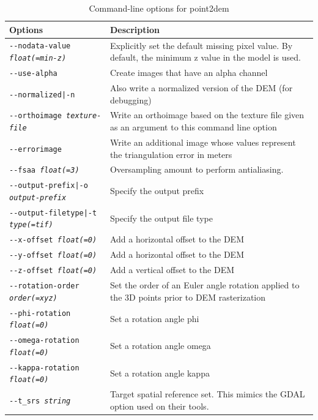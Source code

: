 \begin{longtable}{|p{8cm}|p{9cm}|}
\caption{Command-line options for point2dem}
\label{tbl:point2dem}
\endfirsthead
\endhead
\endfoot
\endlastfoot
\hline
Options & Description \\ \hline \hline
\texttt{-\/-nodata-value \textit{float(=min-z)}} & Explicitly set the default missing pixel value. By default, the minimum z value in the model is used. \\ \hline
\texttt{-\/-use-alpha} & Create images that have an alpha channel \\ \hline
\texttt{-\/-normalized|-n} & Also write a normalized version of the \ac{DEM} (for debugging) \\ \hline
\texttt{-\/-orthoimage \textit{texture-file}} & Write an orthoimage based on the texture file given as an argument to this command line option \\ \hline
\texttt{-\/-errorimage} & Write an additional image whose values represent the triangulation error in meters \\ \hline
\texttt{-\/-fsaa  \textit{float(=3)}} & Oversampling amount to perform antialiasing. \\ \hline
\texttt{-\/-output-prefix|-o \textit{output-prefix}} & Specify the output prefix \\ \hline
\texttt{-\/-output-filetype|-t \textit{type(=tif)}} & Specify the output file type \\ \hline
\hline
\texttt{-\/-x-offset \textit{float(=0)}} & Add a horizontal offset to the \ac{DEM} \\ \hline
\texttt{-\/-y-offset \textit{float(=0)}} & Add a horizontal offset to the \ac{DEM} \\ \hline
\texttt{-\/-z-offset \textit{float(=0)}} & Add a vertical offset to the \ac{DEM} \\ \hline
\texttt{-\/-rotation-order \textit{order(=xyz)}} & Set the order of an Euler angle rotation applied to the 3D points prior to \ac{DEM} rasterization \\ \hline
\texttt{-\/-phi-rotation \textit{float(=0)}} & Set a rotation angle phi \\ \hline
\texttt{-\/-omega-rotation \textit{float(=0)}} & Set a rotation angle omega \\ \hline
\texttt{-\/-kappa-rotation \textit{float(=0)}} & Set a rotation angle kappa \\ \hline
\hline
\texttt{-\/-t\_srs \textit{string}} & Target spatial reference set. This mimics the GDAL option used on their tools. \\ \hline

\end{longtable}
